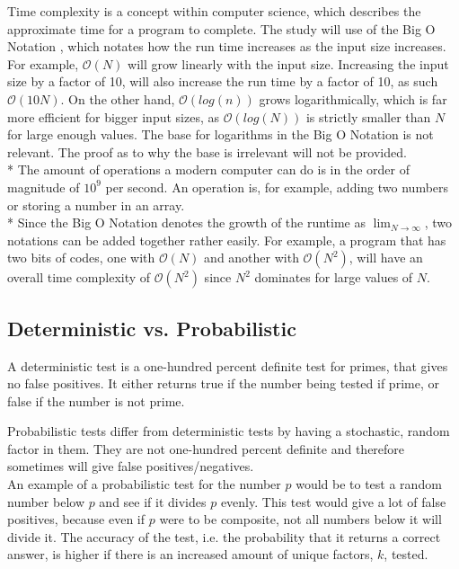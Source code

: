 \documentclass[main.tex]{subfiles}
\begin{document}
Time complexity \cite{theorem:time_comp} is a concept within computer science,
which describes the approximate time for a program to complete. The study will
use of the Big O Notation \cite{theorem:big_O}, which notates how the run time
increases as the input size increases. For example, $\mathcal{O}(N)$ will grow
linearly with the input size. Increasing the input size by a factor of 10, will
also increase the run time by a factor of 10, as such $\mathcal{O}(10N)$. On the
other hand, $\mathcal{O}(log(n))$ grows logarithmically, which is far more
efficient for bigger input sizes, as $\mathcal{O}(log(N))$ is strictly smaller
than $N$ for large enough values. The base for logarithms in the Big O Notation
is not relevant. The proof as to why the base is irrelevant will not be
provided. \newline
\\*
The amount of operations a modern computer can do is in the order of magnitude
of $10^{9}$ per second. An operation is, for example, adding two numbers or
storing a number in an array. \newline
\\*
Since the Big O Notation denotes the growth of the runtime as
$\lim_{N\to\infty}$, two notations can be added together rather easily. For
example, a program that has two bits of codes, one with $\mathcal{O}(N)$ and
another with $\mathcal{O}(N^{2})$, will have an overall time complexity of
$\mathcal{O}(N^{2})$ since $N^{2}$ dominates for large values of $N$. 

\subsection{Deterministic vs. Probabilistic}
A deterministic test is a one-hundred percent definite test for primes, that
gives no false positives. It either returns true if the number being tested if
prime, or false if the number is not prime. \newline

Probabilistic tests differ from deterministic tests by having a stochastic,
random factor in them. They are not one-hundred percent definite and therefore
sometimes will give false positives/negatives. \\

An example of a probabilistic test for the number $p$ would be to test a random
number below $p$ and see if it divides $p$ evenly. This test would give a lot of
false positives, because even if $p$ were to be composite, not all numbers below
it will divide it. The accuracy of the test, i.e. the probability that it
returns a correct answer, is higher if there is an increased amount of unique
factors, $k$, tested.
\end{document}
